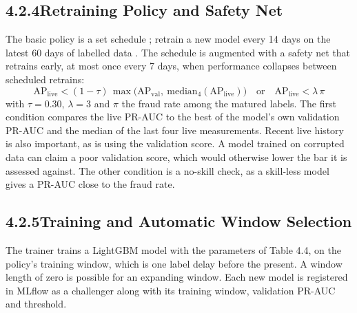 \documentclass[11pt,letterpaper]{report}
\begin{document}
\subsection*{4.2.4\quad Retraining Policy and Safety Net}

The basic policy is a set schedule ; retrain a new model every 14 days on the latest 60 days of labelled data . The schedule is augmented with a safety net that retrains early, at most once every 7 days, when performance collapses between scheduled retrains:
\begin{equation*}
  \mathrm{AP}_{\mathrm{live}} < (1 - \tau)\,\max\big(\mathrm{AP}_{\mathrm{val}},\ \mathrm{median}_{4}(\mathrm{AP}_{\mathrm{live}})\big) \quad\text{or}\quad \mathrm{AP}_{\mathrm{live}} < \lambda\,\pi \tag{4.7}
\end{equation*}
with $\tau = 0.30$, $\lambda = 3$ and $\pi$ the fraud rate among the matured labels. The first condition compares the live PR-AUC to the best of the model's own validation PR-AUC and the median of the last four live measurements. Recent live history is also important, as is using the validation score. A model trained on corrupted data can claim a poor validation score, which would otherwise lower the bar it is assessed against. The other condition is a no-skill check, as a skill-less model gives a PR-AUC close to the fraud rate.

\subsection*{4.2.5\quad Training and Automatic Window Selection}

The trainer trains a LightGBM model with the parameters of Table 4.4, on the policy's training window, which is one label delay before the present. A window length of zero is possible for an expanding window. Each new model is registered in MLflow as a challenger along with its training window, validation PR-AUC and threshold.
\end{document}
